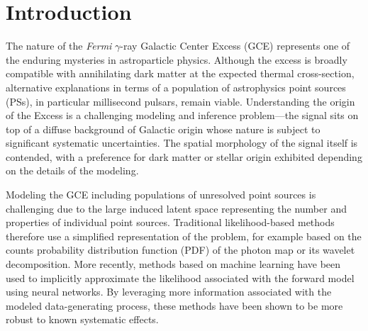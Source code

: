 \documentclass[nohyperref]{article}
\theoremstyle{plain}
\theoremstyle{definition}
\theoremstyle{remark}
\begin{document}
\printAffiliationsAndNotice{}  %

\begin{abstract}
    The increasingly common use of machine learning in astrophysics has led to a need for methods that can explain the decisions of black-box models like neural networks. We explore the use of counterfactuals---perturbations to the data that have a desired downstream effect on the prediction---in the context of testing the robustness of neural networks and interrogating their decisions when applied to the problem of disentangling the contribution of various modeled components in $\gamma$-ray data of the Galactic Center. We introduce a method that can procedurally generate minimal, physically-meaningful counterfactuals for the different components. This lets us probe which features in the data are driving the prediction of the model, as well as which features are used to distinguish between different components. 
\end{abstract}

\section{Introduction}

The nature of the \emph{Fermi} $\gamma$-ray Galactic Center Excess (GCE) represents one of the enduring mysteries in astroparticle physics. Although the excess is broadly compatible with annihilating dark matter at the expected thermal cross-section, alternative explanations in terms of a population of astrophysics point sources (PSs), in particular millisecond pulsars, remain viable. Understanding the origin of the Excess is a challenging modeling and inference problem---the signal sits on top of a diffuse background of Galactic origin whose nature is subject to significant systematic uncertainties. The spatial morphology of the signal itself is contended, with a preference for dark matter or stellar origin exhibited depending on the details of the modeling.
  
Modeling the GCE including populations of unresolved point sources is challenging due to the large induced latent space representing the number and properties of individual point sources. Traditional likelihood-based methods therefore use a simplified representation of the problem, for example based on the counts probability distribution function (PDF) of the photon map or its wavelet decomposition. More recently, methods based on machine learning have been used to implicitly approximate the likelihood associated with the forward model using neural networks. By leveraging more information associated with the modeled data-generating process, these methods have been shown to be more robust to known systematic effects.
\end{document}
